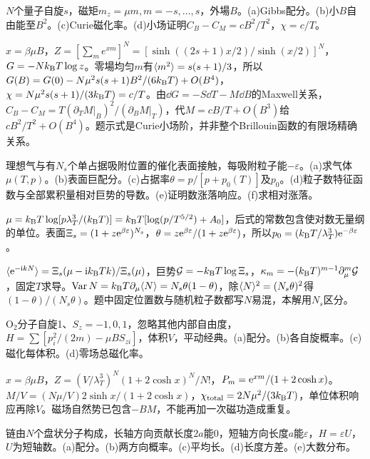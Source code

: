 \begin{exercise}[原题3(a)--(d)]\label{p:333-4-3}
$N$个量子自旋$s$，磁矩$m_z=\mu m,m=-s,\ldots,s$，外場$B$。(a)Gibbs配分。(b)小$B$自由能至$B^2$。(c)Curie磁化率。(d)小场证明$C_B-C_M=cB^2/T^2$，$\chi=c/T$。
\end{exercise}
\begin{solution}
$x=\beta\mu B$，$Z=[\sum_me^{xm}]^N=[\sinh((2s+1)x/2)/\sinh(x/2)]^N$，$G=-Nk_{\mathrm B} T\log z$。零場均匀$m$有$\langle m^2\rangle=s(s+1)/3$，所以$G(B)=G(0)-N\mu^2s(s+1)B^2/(6k_{\mathrm B} T)+O(B^4)$，$\chi=N\mu^2s(s+1)/(3k_{\mathrm B} T)=c/T$。由$\dd G=-S\dd T-M\dd B$的Maxwell关系，$C_B-C_M=T(\partial_TM|_B)^2/(\partial_BM|_T)$，代$M=cB/T+O(B^3)$给$cB^2/T^2+O(B^4)$。题示式是Curie小场阶，并非整个Brillouin函数的有限场精确关系。
\end{solution}
\begin{exercise}[原题4(a)--(f)]\label{p:333-4-4}
理想气与有$N_s$个单占据吸附位置的催化表面接触，每吸附粒子能$-\varepsilon$。(a)求气体$\mu(T,p)$。(b)表面巨配分。(c)占据率$\theta=p/[p+p_0(T)]$及$p_0$。(d)粒子数特征函数与全部累积量相对巨势的导数。(e)证明数涨落响应。(f)求相对涨落。
\end{exercise}
\begin{solution}
$\mu=k_{\mathrm B} T\log[p\lambda_T^3/(k_{\mathrm B} T)]=k_{\mathrm B} T[\log(p/T^{5/2})+A_0]$，后式的常数包含使对数无量纲的单位。表面$\Xi_s=(1+z\mathrm e^{\beta\varepsilon})^{N_s}$，$\theta=z\mathrm e^{\beta\varepsilon}/(1+z\mathrm e^{\beta\varepsilon})$，所以$p_0=(k_{\mathrm B} T/\lambda_T^3)\mathrm e^{-\beta\varepsilon}$。

$\langle \mathrm e^{-\mathrm i kN}\rangle=\Xi_s(\mu-\mathrm ik_{\mathrm B} Tk)/\Xi_s(\mu)$，巨势$\mathcal G=-k_{\mathrm B} T\log\Xi_s$，$\kappa_m=-(k_{\mathrm B} T)^{m-1}\partial_\mu^m\mathcal G$，固定$T$求导。$\operatorname{Var}N=k_{\mathrm B} T\partial_\mu\langle N\rangle=N_s\theta(1-\theta)$，除$\langle N\rangle^2=(N_s\theta)^2$得$(1-\theta)/(N_s\theta)$。题中固定位置数与随机粒子数都写$N$易混，本解用$N_s$区分。
\end{solution}
\begin{exercise}[原题5(a)--(d)]\label{p:333-4-5}
O$_2$分子自旋1、$S_z=-1,0,1$，忽略其他内部自由度，$H=\sum[p_i^2/(2m)-\mu BS_{zi}]$，体积$V$，平动经典。(a)配分。(b)各自旋概率。(c)磁化每体积。(d)零场总磁化率。
\end{exercise}
\begin{solution}
$x=\beta\mu B$，$Z=(V/\lambda_T^3)^N(1+2\cosh x)^N/N!$，$P_m=\mathrm e^{xm}/(1+2\cosh x)$。$M/V=(N\mu/V)2\sinh x/(1+2\cosh x)$，$\chi_{\rm total}=2N\mu^2/(3k_{\mathrm B} T)$，单位体积响应再除$V$。磁场自然势已包含$-BM$，不能再加一次磁功造成重复。
\end{solution}
\begin{exercise}[原题6(a)--(e)]\label{p:333-4-6}
链由$N$个盘状分子构成，长轴方向贡献长度$2a$能0，短轴方向长度$a$能$\varepsilon$，$H=\varepsilon U$，$U$为短轴数。(a)配分。(b)两方向概率。(c)平均长。(d)长度方差。(e)大数分布。
\end{exercise}
